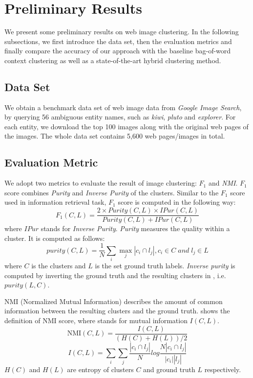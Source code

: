 \section{Preliminary Results}
We present some preliminary results on web image clustering.
In the following subsections, we first introduce the data set,
then the evaluation metrics and finally compare the accuracy
of our approach with the baseline bag-of-word context clustering
as well as a state-of-the-art hybrid clustering method.

\subsection{Data Set}
We obtain a benchmark data set of web image data
from \emph{Google Image Search},
by querying 56 ambiguous entity names, such as \emph{kiwi}, \emph{pluto} and
\emph{explorer}. For each entity, we download the top 100 images along
with the original web pages of the images.
The whole data set contains 5,600 web pages/images in total.

\subsection{Evaluation Metric}
We adopt two metrics to evaluate the result of image clustering:
\emph{$F_1$} and \emph{NMI}.
$F_1$ score combines \emph{Purity} and \emph{Inverse Purity} of the clusters.
Similar to the $F_1$ score used in information retrieval task,
$F_1$ score is computed in the following way:
\begin{equation}
F_1(C,L)=\frac{2\times Purity(C,L)\times IPur(C,L)}{Purity(C,L)+IPur(C,L)}
\end{equation}
where $IPur$ stands for \emph{Inverse Purity}.
\emph{Purity} measures the quality within a cluster. It is computed as follows:
\begin{equation}
purity(C,L)=\frac{1}{N}\sum_i{\max_j{|c_i\cap l_j|}}, c_i\in C\;and\;l_j\in L
\label{equ:purity}
\end{equation}
where $C$ is the clusters and $L$ is the set ground truth labels.
\emph{Inverse purity} is
computed by inverting the ground truth and the resulting clusters in
, i.e. $purity(L,C)$.

NMI (Normalized Mutual Information) describes the
amount of common information between the resulting
clusters and the ground truth.
 shows the definition of NMI score, where 
stands for mutual information $I(C,L)$.
\begin{equation}
\label{nmi}
\mbox{NMI}(C,L)=\frac{I(C,L)}{(H(C)+H(L))/2}
\end{equation}
\begin{equation}
\label{mi}
I(C,L)=\sum_i{\sum_j{\frac{|c_i\cap l_j|}{N}log\frac{N|c_i\cap l_j|}{|c_i||l_j|}}}
\end{equation}
$H(C)$ and $H(L)$ are entropy of clusters $C$ and ground truth $L$ respectively.


